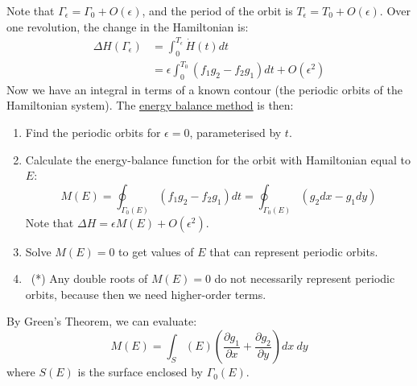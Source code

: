 \documentclass[../Main.tex]{subfiles}
\begin{document}
Note that $\Gamma_\epsilon = \Gamma_0 + O(\epsilon)$, and the period of the orbit is $T_\epsilon = T_0 + O(\epsilon)$. Over one revolution, the change in the Hamiltonian is:
\begin{align*}
    \Delta H(\Gamma_\epsilon) &= \int_{0}^{T_\epsilon} \dot{H}(t) dt \\
    &= \epsilon\int_{0}^{T_0} (f_1 g_2 - f_2 g_1) dt + O(\epsilon^2)
\end{align*}
Now we have an integral in terms of a known contour (the periodic orbits of the Hamiltonian system). The \underline{energy balance method} is then:
\begin{enumerate}
    \item Find the periodic orbits for $\epsilon = 0$, parameterised by $t$.
    \item Calculate the energy-balance function for the orbit with Hamiltonian equal to $E$:
        \begin{equation*}
            M(E) = \oint_{\Gamma_0(E)} \left(f_1 g_2 - f_2 g_1\right) dt = \oint_{\Gamma_0(E)} \left(g_2 dx - g_1 dy\right)
        \end{equation*}
        Note that $\Delta H = \epsilon M(E) + O(\epsilon^2)$.
    \item Solve $M(E) = 0$ to get values of $E$ that can represent periodic orbits.
    \item~(*) Any double roots of $M(E) = 0$ do not necessarily represent periodic orbits, because then we need higher-order terms.
\end{enumerate}
By Green's Theorem, we can evaluate:
\begin{equation*}
    M(E) = \int_S(E) \left(\frac{\partial g_1}{\partial x} + \frac{\partial g_2}{\partial y}\right) dx~dy
\end{equation*}
where $S(E)$ is the surface enclosed by $\Gamma_0(E)$.
\end{document}
